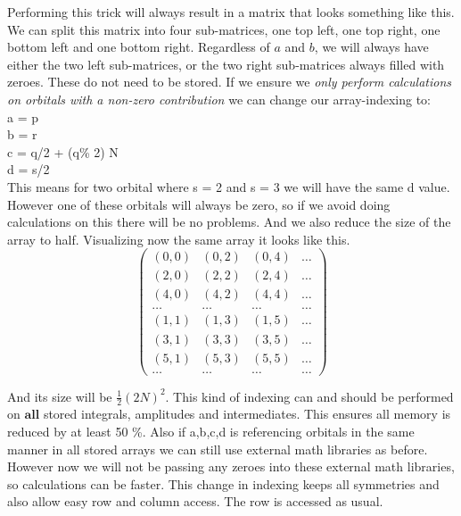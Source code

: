 \documentclass[a4paper,norsk,11pt,twoside]{report}
\begin{document}
Performing this trick will always result in a matrix that looks something like this. We can split this matrix into four sub-matrices, one top left, one top right, one bottom left and one bottom right. Regardless of $a$ and $b$, we will always have either the two left sub-matrices, or the two right sub-matrices always filled with zeroes. These do not need to be stored. If we ensure we \emph{only perform calculations on orbitals with a non-zero contribution} we can change our array-indexing to:\\
a = p\\
b = r\\
c = q/2 + (q\% 2) N\\
d = s/2 \\

This means for two orbital where s = 2 and s = 3 we will have the same d value. However one of these orbitals will always be zero, so if we avoid doing calculations on this there will be no problems. And we also reduce the size of the array to half. Visualizing now the same array it looks like this.
\[ \left( \begin{array}{cccc}
(0,0) & (0,2) & (0,4) & \dots \\
(2,0) & (2,2) & (2,4) & \dots \\
(4,0) & (4,2) & (4,4) & \dots \\
\dots & \dots & \dots & \dots \\
(1,1) & (1,3) & (1,5) & \dots \\
(3,1) & (3,3) & (3,5) & \dots \\
(5,1) & (5,3) & (5,5) & \dots \\
\dots & \dots & \dots & \dots  \end{array} \right)\]

And its size will be $\frac{1}{2} (2N)^2$. This kind of indexing can and should be performed on $\textbf{all}$ stored integrals, amplitudes and intermediates. This ensures all memory is reduced by at least 50 \%. Also if a,b,c,d is referencing orbitals in the same manner in all stored arrays we can still use external math libraries as before. However now we will not be passing any zeroes into these external math libraries, so calculations can be faster. This change in indexing keeps all symmetries and also allow easy row and column access. The row is accessed as usual.
\end{document}

